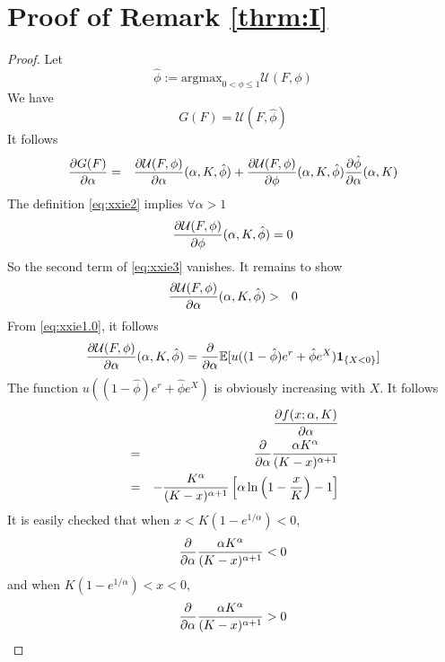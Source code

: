 \documentclass[11pt,a4]{amsart}
\newcommand{\pd}{\partial}
\newcommand{\E }{{\mathbb E}}
\newcommand{\1}{{\mathbf 1}}
\begin{document}
\section{Proof of Remark \ref{thrm:I}}
\label{sec:thrmI_proof}
\begin{proof}
  Let
  \begin{equation}
    \label{eq:xxie2}
    \hat \phi := \text{argmax}_{0 < \phi \leq 1} \mathcal U(F, \phi)
  \end{equation}
  We have
  \[
  G(F) = \mathcal U(F, \hat\phi)
  \]
  It follows
  \begin{eqnarray}
    {\pd G(F) \over \pd \alpha}
    &=&
    {\pd \mathcal U(F, \phi) \over \pd \alpha}(\alpha, K, \hat\phi)
    + {\pd \mathcal U(F, \phi) \over \pd \phi}(\alpha, K, \hat\phi)
    {\pd \hat\phi \over \pd \alpha}(\alpha, K)
    \label{eq:xxie3}
  \end{eqnarray}
  The definition \eqref{eq:xxie2} implies $\forall \alpha > 1$
  \begin{equation}
    \label{eq:xxie4}
    {\pd \mathcal U(F, \phi) \over \pd \phi}(\alpha, K, \hat \phi) = 0
  \end{equation}
  So the second term of \eqref{eq:xxie3} vanishes. It remains to show
  \begin{eqnarray*}
    {\pd \mathcal U(F, \phi) \over \pd \alpha}(\alpha, K, \hat \phi)
    &>& 0
  \end{eqnarray*}
  From \eqref{eq:xxie1.0}, it follows
  \begin{eqnarray*}
    {\pd \mathcal U(F, \phi) \over \pd \alpha}(\alpha, K, \hat\phi)
    = {\partial \over \partial \alpha}\E[u((1 - \hat\phi) e^r + \hat\phi e^X) \1_{\{X < 0\}}]
  \end{eqnarray*}
  The function $u((1 - \hat\phi) e^r + \hat\phi e^X)$ is obviously
  increasing with $X$. It follows
  \begin{eqnarray*}
    && {\pd f(x; \alpha, K) \over \pd \alpha} \\
    &=& {\partial \over \partial \alpha} {\alpha K^\alpha \over (K - x)^{\alpha + 1}} \\
    &=&
    - {K^\alpha \over (K - x)^{\alpha + 1}}
    \left[
      \alpha
      \ln\left(
        1 - {x \over K}
      \right) - 1
    \right]
  \end{eqnarray*}
  It is easily checked that when $x < K(1 - e^{1/\alpha}) < 0$,
  \[
  {\partial \over \partial \alpha} {\alpha K^\alpha \over (K - x)^{\alpha + 1}} < 0
  \]
  and when $K(1 - e^{1/\alpha}) < x < 0$,
  \[
  {\partial \over \partial \alpha} {\alpha K^\alpha \over (K - x)^{\alpha + 1}} > 0
\]
\end{proof}
\end{document}
